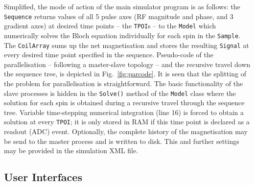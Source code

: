 \documentclass[journal,onecolumn,12pt]{IEEEtran}
\begin{document}
Simplified, the mode of action of the main simulator program is as follows: the \verb+Sequence+ returns values of all 5
pulse axes (RF magnitude and phase, and 3 gradient axes) at desired time points -- the \verb+TPOI+s -- to the
\verb+Model+ which numerically solves the Bloch equation individually for each spin in the \verb+Sample+. The
\verb+CoilArray+ sums up the net magnetisation and stores the resulting \verb+Signal+ at every desired time point
specified in the sequence. Pseudo-code of the parallelisation -- following a master-slave topology -- and the recursive
travel down the sequence tree, is depicted in Fig.~\ref{fig:parcode}. It is seen that the splitting of the problem for
parallelisation is straightforward. The basic functionality of the slave processes is hidden in the \verb+Solve()+
method of the \verb+Model+ class where the solution for each spin is obtained during a recursive travel through the
sequence tree. Variable time-stepping numerical integration (line 16) is forced to obtain a solution at every
\verb+TPOI+; it is only stored in RAM if this time point is declared as a readout (ADC) event. Optionally, the complete
history of the magnetisation may be send to the master process and is written to disk.  This and further settings may be
provided in the simulation XML file.



\subsection{User Interfaces}\label{ssec:gui}
\end{document}
